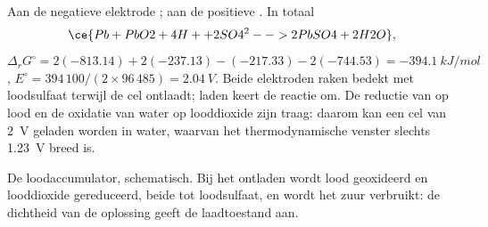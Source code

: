 \begin{example}[De loodaccumulator]\label{ex:b2:batteries-electrolysis:lead}
Aan de negatieve elektrode ; aan de positieve
. In totaal
\[
  \ce{Pb + PbO2 + 4H+ + 2SO4^2- -> 2PbSO4 + 2H2O},
\]
$\Delta_r G^\circ = 2(-813.14) + 2(-237.13) - (-217.33) - 2(-744.53) =
\qty{-394.1}{kJ/mol}$, $E^\circ = 394\,100/(2 \times 96\,485) = \qty{2.04}{V}$.
Beide elektroden raken bedekt met loodsulfaat terwijl de cel ontlaadt; laden
keert de reactie om. De reductie van  op lood en de oxidatie van
water op looddioxide zijn traag: daarom kan een cel van \qty{2}{V} geladen worden
in water, waarvan het thermodynamische venster slechts \qty{1.23}{V} breed is.
\end{example}

\begin{omfigure}

{\small De loodaccumulator, schematisch. Bij het ontladen wordt lood geoxideerd
en looddioxide gereduceerd, beide tot loodsulfaat, en wordt het zuur verbruikt: de
dichtheid van de oplossing geeft de laadtoestand aan.}
\end{omfigure}

